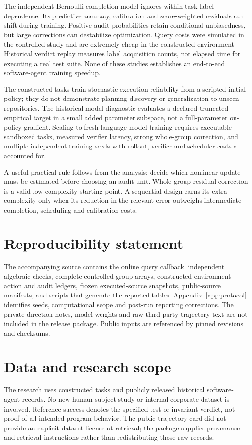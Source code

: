 \documentclass[11pt]{article}
\begin{document}
The independent-Bernoulli completion model ignores within-task label dependence. Its predictive accuracy, calibration and score-weighted residuals can shift during training. Positive audit probabilities retain conditional unbiasedness, but large corrections can destabilize optimization. Query costs were simulated in the controlled study and are extremely cheap in the constructed environment. Historical verdict replay measures label acquisition counts, not elapsed time for executing a real test suite. None of these studies establishes an end-to-end software-agent training speedup.

The constructed tasks train stochastic execution reliability from a scripted initial policy; they do not demonstrate planning discovery or generalization to unseen repositories. The historical model diagnostic evaluates a declared truncated empirical target in a small added parameter subspace, not a full-parameter on-policy gradient. Scaling to fresh language-model training requires executable sandboxed tasks, measured verifier latency, strong whole-group correction, and multiple independent training seeds with rollout, verifier and scheduler costs all accounted for.

A useful practical rule follows from the analysis: decide which nonlinear update must be estimated before choosing an audit unit. Whole-group residual correction is a valid low-complexity starting point. A sequential design earns its extra complexity only when its reduction in the relevant error outweighs intermediate-completion, scheduling and calibration costs.

\section*{Reproducibility statement}
The accompanying source contains the online query callback, independent algebraic checks, complete controlled group arrays, constructed-environment action and audit ledgers, frozen executed-source snapshots, public-source manifests, and scripts that generate the reported tables. Appendix~\ref{app:protocol} identifies seeds, computational scope and post-run reporting corrections. The private direction notes, model weights and raw third-party trajectory text are not included in the release package. Public inputs are referenced by pinned revisions and checksums.

\section*{Data and research scope}
The research uses constructed tasks and publicly released historical software-agent records. No new human-subject study or internal corporate dataset is involved. Reference success denotes the specified test or invariant verdict, not proof of all intended program behavior. The public trajectory card did not provide an explicit dataset license at retrieval; the package supplies provenance and retrieval instructions rather than redistributing those raw records.



\clearpage
\appendix



\end{document}
